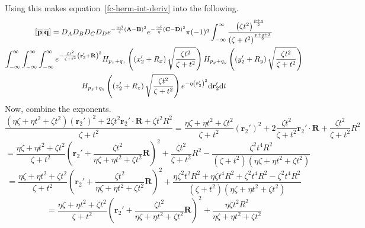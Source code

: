 Using this makes equation~\ref{fc-herm-int-deriv} into the following.
\begin{multline}
  \left[\overline{\mathbf{p}}\middle|\overline{\mathbf{q}}\right] = D_A D_B D_C D_D e^{-\frac{\alpha\beta}{\zeta}\left(\mathbf{A} - \mathbf{B}\right)^2}e^{-\frac{\gamma\delta}{\eta}\left(\mathbf{C} - \mathbf{D}\right)^2}\pi (-1)^{q} \int_{-\infty}^\infty \frac{\left(\zeta t^2\right)^{\frac{p + q}{2}}}{\left(\zeta + t^2\right)^{\frac{p + q + 3}{2}}} \\
  \int_{-\infty}^\infty\int_{-\infty}^\infty\int_{-\infty}^\infty e^{-\frac{\zeta t^2}{\zeta + t^2}\left(\mathbf{r}_2' + \mathbf{R}\right)^2} H_{p_x + q_x}\left(\left(x_2' + R_x\right)\sqrt{\frac{\zeta t^2}{\zeta + t^2}}\right)H_{p_y + q_y}\left(\left(y_2' + R_y\right)\sqrt{\frac{\zeta t^2}{\zeta + t^2}}\right)\\
  H_{p_z + q_z}\left(\left(z_2' + R_z\right)\sqrt{\frac{\zeta t^2}{\zeta + t^2}}\right)e^{-\eta\left(\mathbf{r}_2'\right)^2} \mathrm{d}\mathbf{r}_2' \mathrm{d} t
\end{multline}
Now, combine the exponents.
\begin{equation}
  \frac{\left(\eta\zeta + \eta t^2 + \zeta t^2\right)\left(\mathbf{r}_2'\right)^2 + 2\zeta t^2 \mathbf{r}_2'\cdot\mathbf{R} + \zeta t^2 R^2}{\zeta + t^2} = \frac{\eta\zeta + \eta t^2 + \zeta t^2}{\zeta + t^2}\left(\mathbf{r}_2'\right)^2 + 2\frac{\zeta t^2}{\zeta + t^2} \mathbf{r}_2' \cdot \mathbf{R} + \frac{\zeta t^2}{\zeta + t^2} R^2
\end{equation}
\begin{equation}
  = \frac{\eta\zeta + \eta t^2 + \zeta t^2}{\zeta + t^2}\left(\mathbf{r}_2' + \frac{\zeta t^2}{\eta\zeta + \eta t^2 + \zeta t^2} \mathbf{R}\right)^2 + \frac{\zeta t^2}{\zeta + t^2} R^2 - \frac{\zeta^2 t^4 R^2}{\left(\zeta + t^2\right)\left(\eta\zeta + \eta t^2 + \zeta t^2\right)}
\end{equation}
\begin{equation}
  = \frac{\eta\zeta + \eta t^2 + \zeta t^2}{\zeta + t^2}\left(\mathbf{r}_2' + \frac{\zeta t^2}{\eta\zeta + \eta t^2 + \zeta t^2} \mathbf{R}\right)^2 + \frac{\eta\zeta^2 t^2 R^2 + \eta\zeta t^4 R^2 + \zeta^2 t^4 R^2 - \zeta^2 t^4 R^2}{\left(\zeta + t^2\right)\left(\eta\zeta + \eta t^2 + \zeta t^2\right)}
\end{equation}
\begin{equation}
  = \frac{\eta\zeta + \eta t^2 + \zeta t^2}{\zeta + t^2}\left(\mathbf{r}_2' + \frac{\zeta t^2}{\eta\zeta + \eta t^2 + \zeta t^2} \mathbf{R}\right)^2 + \frac{\eta\zeta t^2 R^2}{\eta\zeta + \eta t^2 + \zeta t^2}
\end{equation}
